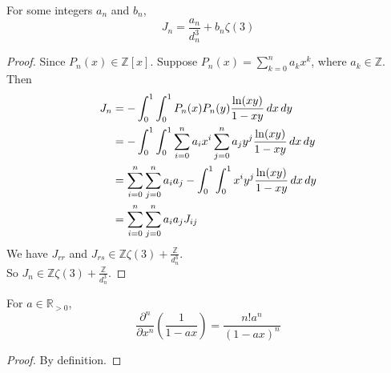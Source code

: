 \begin{lemma}\label{J_n_integers_an_bn}
    For some integers $a_n$ and $b_n$,
    \[ J_n = \frac{a_n}{d_n^3} + b_n\zeta(3) \]
\end{lemma}
\begin{proof}
    \leanok
    Since $P_n(x) \in \mathbb{Z}[x]$. Suppose $P_n(x) = \sum\limits_{k=0}^{n}a_kx^k$, where $a_k \in \mathbb{Z}$.\\
    Then 
    \begin{align*}
        J_n &= -\int_{0}^{1}\int_{0}^{1} P_n(x)P_n(y)\frac{{\rm ln}(xy)}{1-xy} \, dx \, dy \\
        &= -\int_{0}^{1}\int_{0}^{1} \sum\limits_{i=0}^{n}a_ix^i \sum\limits_{j=0}^{n}a_jy^j \frac{{\rm ln}(xy)}{1-xy} \, dx \, dy\\
        &= \sum\limits_{i=0}^{n}\sum\limits_{j=0}^{n}a_i a_j -\int_{0}^{1}\int_{0}^{1} x^i y^j \frac{{\rm ln}(xy)}{1-xy} \, dx \, dy\\
        &= \sum\limits_{i=0}^{n}\sum\limits_{j=0}^{n}a_i a_j J_{ij}\\
    \end{align*}
    We have $J_{rr}$ and $J_{rs} \in \mathbb{Z}\zeta(3) + \frac{\mathbb{Z}}{d_n^3}$.\\
    So $J_n \in \mathbb{Z}\zeta(3) + \frac{\mathbb{Z}}{d_n^3}$.
\end{proof}

\begin{lemma}\label{frac_partial_n}
    For $a \in \mathbb{R}_{>0}$,
    \[ \frac{\partial^n}{\partial x^n}(\frac{1}{1-ax}) = \frac{n!a^n}{(1-ax)^n} \]
\end{lemma}
\begin{proof}
    \leanok
    By definition.
\end{proof}

